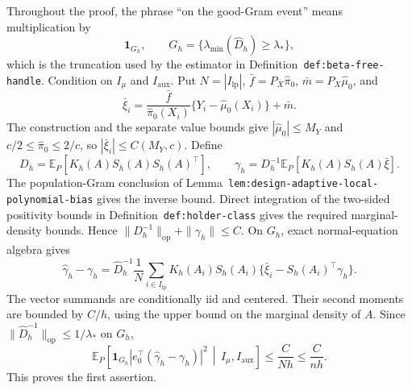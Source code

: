 Throughout the proof, the phrase ``on the good-Gram event'' means multiplication by
\[
\mathbf1_{G_h},
\qquad
G_h=\{\lambda_{\min}(\widehat D_h)\ge\lambda_*\},
\]
which is the truncation used by the estimator in Definition~\texttt{def:beta-free-handle}. Condition on \(I_\mu\) and \(I_{\mathrm{aux}}\). Put \(N=|I_{\mathrm{lp}}|\), \(\bar f=P_X\widehat\pi_0\), \(\bar m=P_X\widehat\mu_0\), and
\[
\bar\xi_i=
\frac{\bar f}{\widehat\pi_0(X_i)}\{Y_i-\widehat\mu_0(X_i)\}+\bar m.
\]
The construction and the separate value bounds give \(|\widehat\mu_0|\le M_Y\) and \(c/2\le\widehat\pi_0\le2/c\), so \(|\bar\xi_i|\le C(M_Y,c)\). Define
\[
D_h=\mathbb E_P[K_h(A)S_h(A)S_h(A)^\top],
\qquad
\gamma_h=D_h^{-1}\mathbb E_P[K_h(A)S_h(A)\bar\xi].
\]
The population-Gram conclusion of Lemma~\texttt{lem:design-adaptive-local-polynomial-bias} gives the inverse bound. Direct integration of the two-sided positivity bounds in Definition~\texttt{def:holder-class} gives the required marginal-density bounds. Hence \(\|D_h^{-1}\|_{\mathrm{op}}+\|\gamma_h\|\le C\). On \(G_h\), exact normal-equation algebra gives
\[
\widehat\gamma_h-\gamma_h
=
\widehat D_h^{-1}\frac1N\sum_{i\in I_{\mathrm{lp}}}
K_h(A_i)S_h(A_i)\{\bar\xi_i-S_h(A_i)^\top\gamma_h\}.
\]
The vector summands are conditionally iid and centered. Their second moments are bounded by \(C/h\), using the upper bound on the marginal density of \(A\). Since \(\|\widehat D_h^{-1}\|_{\mathrm{op}}\le1/\lambda_*\) on \(G_h\),
\[
\mathbb E_P\!\left[
\mathbf1_{G_h}|e_0^\top(\widehat\gamma_h-\gamma_h)|^2
\,\middle|\,I_\mu,I_{\mathrm{aux}}
\right]
\le\frac{C}{Nh}\le\frac{C}{nh}.
\]
This proves the first assertion.

